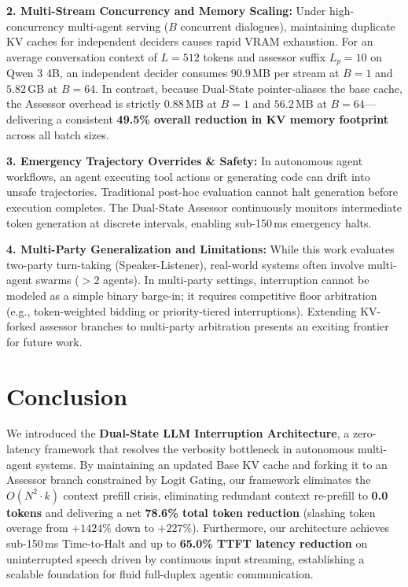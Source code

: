 \documentclass{article}
\begin{document}
\textbf{2. Multi-Stream Concurrency and Memory Scaling:}
Under high-concurrency multi-agent serving ($B$ concurrent dialogues), maintaining duplicate KV caches for independent deciders causes rapid VRAM exhaustion. For an average conversation context of $L=512$ tokens and assessor suffix $L_p=10$ on Qwen 3 4B, an independent decider consumes $90.9$\,MB per stream at $B=1$ and $5.82$\,GB at $B=64$. In contrast, because Dual-State pointer-aliases the base cache, the Assessor overhead is strictly $0.88$\,MB at $B=1$ and $56.2$\,MB at $B=64$---delivering a consistent \textbf{49.5\% overall reduction in KV memory footprint} across all batch sizes.

\textbf{3. Emergency Trajectory Overrides \& Safety:}
In autonomous agent workflows, an agent executing tool actions or generating code can drift into unsafe trajectories. Traditional post-hoc evaluation cannot halt generation before execution completes. The Dual-State Assessor continuously monitors intermediate token generation at discrete intervals, enabling sub-150\,ms emergency halts.

\textbf{4. Multi-Party Generalization and Limitations:}
While this work evaluates two-party turn-taking (Speaker-Listener), real-world systems often involve multi-agent swarms ($>2$ agents). In multi-party settings, interruption cannot be modeled as a simple binary barge-in; it requires competitive floor arbitration (e.g., token-weighted bidding or priority-tiered interruptions). Extending KV-forked assessor branches to multi-party arbitration presents an exciting frontier for future work.

\section{Conclusion}

We introduced the \textbf{Dual-State LLM Interruption Architecture}, a zero-latency framework that resolves the verbosity bottleneck in autonomous multi-agent systems. By maintaining an updated Base KV cache and forking it to an Assessor branch constrained by Logit Gating, our framework eliminates the $O(N^2 \cdot k)$ context prefill crisis, eliminating redundant context re-prefill to \textbf{0.0 tokens} and delivering a net \textbf{78.6\% total token reduction} (slashing token overage from $+1424\%$ down to $+227\%$). Furthermore, our architecture achieves sub-150\,ms Time-to-Halt and up to \textbf{65.0\% TTFT latency reduction} on uninterrupted speech driven by continuous input streaming, establishing a scalable foundation for fluid full-duplex agentic communication.
\end{document}
